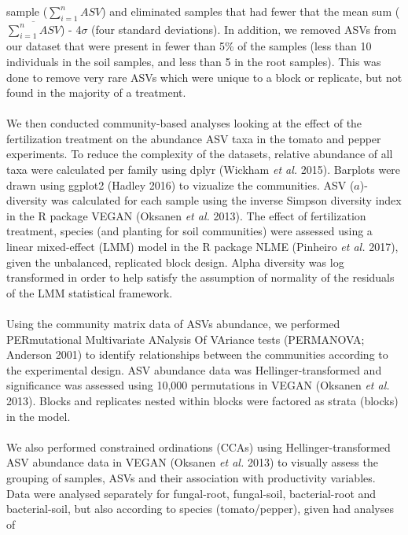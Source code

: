 \documentclass[11pt,]{article}
\begin{document}
sample (\(\sum_{i=1}^n ASV\)) and eliminated samples that had fewer that
the mean sum (\(\overline{\sum_{i=1}^n ASV}\)) - 4\(\sigma\) (four
standard deviations). In addition, we removed ASVs from our dataset that
were present in fewer than 5\% of the samples (less than 10 individuals
in the soil samples, and less than 5 in the root samples). This was done
to remove very rare ASVs which were unique to a block or replicate, but
not found in the majority of a treatment.\\
\hspace*{0.333em}\\
We then conducted community-based analyses looking at the effect of the
fertilization treatment on the abundance ASV taxa in the tomato and
pepper experiments. To reduce the complexity of the datasets, relative
abundance of all taxa were calculated per family using dplyr (Wickham
\emph{et al.} 2015). Barplots were drawn using ggplot2 (Hadley 2016) to
vizualize the communities. ASV (\(a\))-diversity was calculated for each
sample using the inverse Simpson diversity index in the R package VEGAN
(Oksanen \emph{et al.} 2013). The effect of fertilization treatment,
species (and planting for soil communities) were assessed using a linear
mixed-effect (LMM) model in the R package NLME (Pinheiro \emph{et al.}
2017), given the unbalanced, replicated block design. Alpha diversity
was log transformed in order to help satisfy the assumption of normality
of the residuals of the LMM statistical framework.\\
\hspace*{0.333em}\\
Using the community matrix data of ASVs abundance, we performed
PERmutational Multivariate ANalysis Of VAriance tests (PERMANOVA;
Anderson 2001) to identify relationships between the communities
according to the experimental design. ASV abundance data was
Hellinger-transformed and significance was assessed using 10,000
permutations in VEGAN (Oksanen \emph{et al.} 2013). Blocks and
replicates nested within blocks were factored as strata (blocks) in the
model.\\
\hspace*{0.333em}\\
We also performed constrained ordinations (CCAs) using
Hellinger-transformed ASV abundance data in VEGAN (Oksanen \emph{et al.}
2013) to visually assess the grouping of samples, ASVs and their
association with productivity variables. Data were analysed separately
for fungal-root, fungal-soil, bacterial-root and bacterial-soil, but
also according to species (tomato/pepper), given had analyses of
\end{document}
